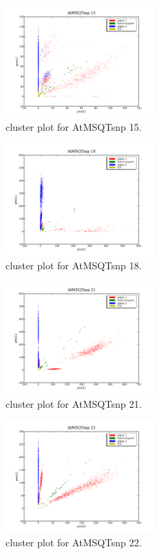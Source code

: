 \begin{figure}[H]
\includegraphics[width=0.5\textwidth]{figures/cluster_plot_AtMSQTsnp_15.png}
\caption{cluster plot for AtMSQTsnp 15.} \label{flAtMSQTsnp15}
\end{figure}
\begin{figure}[H]
\includegraphics[width=0.5\textwidth]{figures/cluster_plot_AtMSQTsnp_18.png}
\caption{cluster plot for AtMSQTsnp 18.} \label{flAtMSQTsnp18}
\end{figure}
\begin{figure}[H]
\includegraphics[width=0.5\textwidth]{figures/cluster_plot_AtMSQTsnp_21.png}
\caption{cluster plot for AtMSQTsnp 21.} \label{flAtMSQTsnp21}
\end{figure}
\begin{figure}[H]
\includegraphics[width=0.5\textwidth]{figures/cluster_plot_AtMSQTsnp_22.png}
\caption{cluster plot for AtMSQTsnp 22.} \label{flAtMSQTsnp22}
\end{figure}
